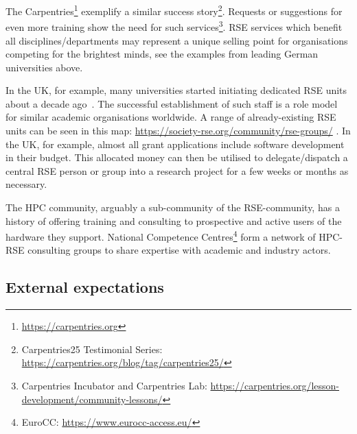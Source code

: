 \documentclass[a4paper]{article}
\begin{document}
 The Carpentries\footnote{\url{https://carpentries.org}}\autocite{Wilson2006} exemplify a similar success story\footnote{Carpentries25 Testimonial Series: \url{https://carpentries.org/blog/tag/carpentries25/}}.
 Requests or suggestions for even more training show the need for such services\footnote{Carpentries Incubator and Carpentries Lab: \url{https://carpentries.org/lesson-development/community-lessons/}}.
RSE services which benefit all disciplines/departments may represent a unique selling point for organisations competing for the brightest minds, see the examples from leading German universities above.


In the UK, for example, many universities started initiating dedicated RSE units about a decade ago~\autocite{Crouch2013}.
The successful establishment of such staff is a role model for similar academic organisations worldwide.
A range of already-existing RSE units can be seen in this map: \url{https://society-rse.org/community/rse-groups/} .
In the UK, for example, almost all grant applications include software development in their budget.
This allocated money can then be utilised to delegate/dispatch a central RSE person or group into a research project for a few weeks or months as necessary.

The HPC community,
arguably a sub-community of the RSE-community,
has a history of offering training and consulting to prospective and active users of the hardware they support.
National Competence Centres\footnote{EuroCC: \url{https://www.eurocc-access.eu/}} form a network of HPC-RSE consulting groups to share expertise with academic and industry actors\autocite{eurocc_success_stories_2023,eurocc_success_stories_2024}.

\subsection{External expectations}
\end{document}
